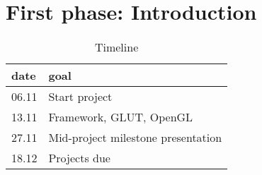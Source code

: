 \chapter*{First phase: Introduction}
\begin{table}
	\centering
	\begin{tabular}{ll}
		\toprule
		date& goal\\
		\midrule
		06.11& Start project\\
		13.11& Framework, GLUT, OpenGL\\
		27.11& Mid-project milestone presentation\\
		18.12& Projects due\\
		\bottomrule
	\end{tabular}
	\caption{Timeline}
	\label{tab:timeline}
\end{table}
